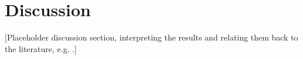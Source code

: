 \section{Discussion}
[Placeholder discussion section, interpreting the results and relating them
back to the literature, e.g. \cite{Placeholder2021}.]
